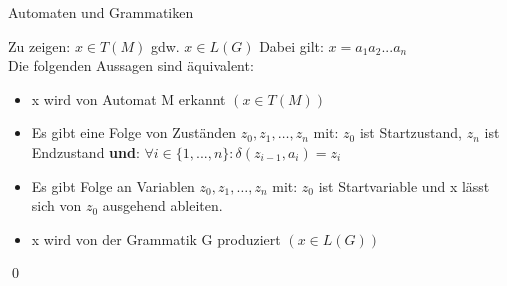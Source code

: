 \documentclass[10pt]{beamer}
\begin{document}
\begin{frame}[fragile]{Automaten und Grammatiken}
    \begin{alertblock}{Zu zeigen: $x \in T(M)$ gdw. $x \in L(G)$}
    Dabei gilt: $x=a_1 a_2 ... a_n$\\
    Die folgenden Aussagen sind äquivalent:
        \begin{itemize}
            \item x wird von Automat M erkannt \emph{$(x\in T(M))$}
            \item Es gibt eine Folge von Zuständen $z_0, z_1, \dots, z_n$ mit: $z_0$ ist Startzustand, $z_n$ ist Endzustand \textbf{und}: $\forall i \in \{1, ..., n\}: \delta(z_{i-1}, a_i)=z_i$
            \item Es gibt Folge an Variablen $z_0, z_1, \dots, z_n$ mit: $z_0$ ist Startvariable und x lässt sich von $z_0$ ausgehend ableiten.
            \item x wird von der Grammatik G produziert \emph{$(x \in L(G))$}
        \end{itemize}
        \qed
    \end{alertblock}
\end{frame}



        
\end{document}
